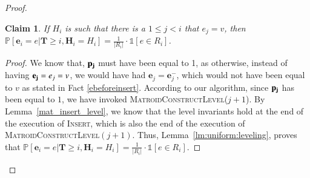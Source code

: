 \documentclass[11pt]{article}
\newtheorem{claim}{Claim}[section]
\renewcommand{\Pr}[1]{\ensuremath{\mathbb{P}\left[#1\right]}}
\newcommand{\ind}[1]{\ensuremath{\mathds{1}\left[#1\right]}}
\newcommand{\MatroidConstLevel}{\textsc{MatroidConstructLevel}}
\newcommand{\insertv}{{\textsc{Insert}}}
\newcommand{\bE}{\ensuremath{\mathbf{e}}}
\newcommand{\bT}{\ensuremath{\mathbf{T}}}
\newcommand{\bH}{\ensuremath{\mathbf{H}}}
\begin{document}
\begin{proof}
\begin{claim}
\label{insertcase1}
If $H_i$ is such that there is a $1 \le j < i$ that $e_j = v$, then  
$\Pr{\bE_i = e | \bT \geq i, \bH_i = H_i} = \frac{1}{|R_i|} \cdot \ind{e \in R_i}$.
\end{claim}

\begin{proof}
We know that, $\bold{p_j}$ 
must have been equal to 1, as otherwise, instead of having $\bold{e_j} = e_j = v$, we would have had $\bE_j = \bE_j^-$, which would not have been equal to $v$ as stated in Fact \ref{ebeforeinsert}. According to our algorithm, since $\bold{p_j}$ has been equal to $1$, we have invoked \MatroidConstLevel($j + 1$). 
By Lemma~\ref{mat_insert_level}, we know that the level invariants hold at the end of the execution of \insertv{}, which is also the end of the execution of \MatroidConstLevel{$(j + 1)$}. 
Thus, Lemma~\ref{lm:uniform:leveling}, proves that $\Pr{\bE_i = e | \bT \geq i, \bH_i = H_i} = \frac{1}{|R_i|}\cdot \ind{e \in R_i}$.
\end{proof}


\end{proof}
\end{document}
